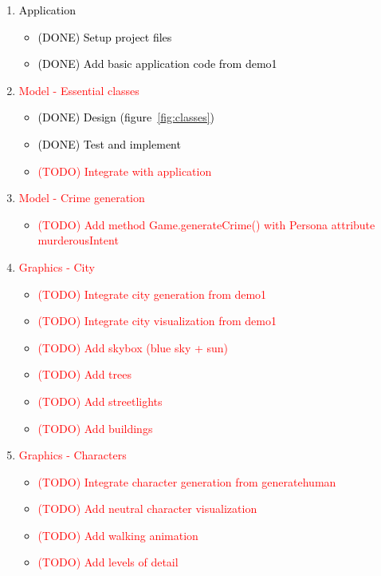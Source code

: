 \documentclass[a4paper, twoside]{article}
\begin{document}
\begin{enumerate}
	\item{} \textcolor{black}{Application} \begin{itemize}
		\item{} \textcolor{black}{(DONE) Setup project files}
		\item{} \textcolor{black}{(DONE) Add basic application code from demo1}
	\end{itemize}
	\item{} \textcolor{red}{Model - Essential classes} \begin{itemize}
		\item{} \textcolor{black}{(DONE) Design (figure~\ref{fig:classes})}
		\item{} \textcolor{black}{(DONE) Test and implement}
		\item{} \textcolor{red}{(TODO) Integrate with application}
	\end{itemize}
	\item{} \textcolor{red}{Model - Crime generation} \begin{itemize}
		\item{} \textcolor{red}{(TODO) Add method Game.generateCrime() with Persona attribute murderousIntent}
	\end{itemize}
	\item{} \textcolor{red}{Graphics - City} \begin{itemize}
		\item{} \textcolor{red}{(TODO) Integrate city generation from demo1}
		\item{} \textcolor{red}{(TODO) Integrate city visualization from demo1}
		\item{} \textcolor{red}{(TODO) Add skybox (blue sky + sun)}
		\item{} \textcolor{red}{(TODO) Add trees}
		\item{} \textcolor{red}{(TODO) Add streetlights}
		\item{} \textcolor{red}{(TODO) Add buildings}
	\end{itemize}
	\item{} \textcolor{red}{Graphics - Characters} \begin{itemize}
		\item{} \textcolor{red}{(TODO) Integrate character generation from generatehuman}
		\item{} \textcolor{red}{(TODO) Add neutral character visualization}
		\item{} \textcolor{red}{(TODO) Add walking animation}
		\item{} \textcolor{red}{(TODO) Add levels of detail}

\end{itemize}
\end{enumerate}
\end{document}
